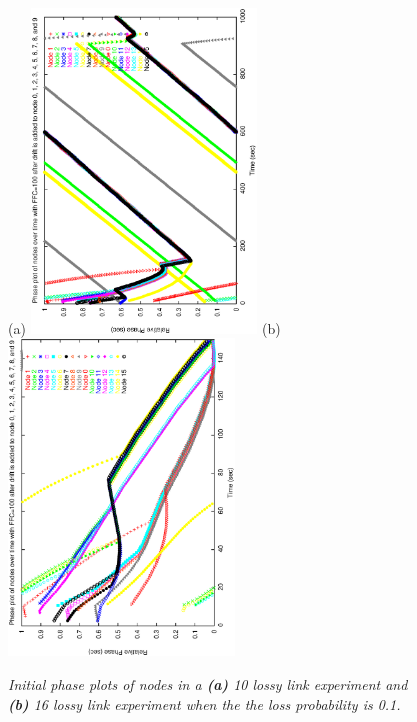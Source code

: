 \begin{figure}
\centerline{%
(a)
\includegraphics[width=6cm,angle=270]{figures/10-links-loss-0.1-run-10-begin-phase.ps}
(b)
\includegraphics[width=6cm,angle=270]{figures/16-links-loss-0.1-run-10-begin-phase.ps}
}
\caption{ {\it Initial phase plots of nodes in a {\bf(a)} 10 lossy link experiment and {\bf(b)} 16 lossy link experiment when the the loss probability is 0.1.}}
\label{fig:begin-phase10-16}
\end{figure}


